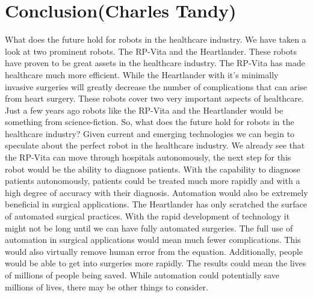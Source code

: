 \documentclass[11pt,conference]{IEEEtran}
\begin{document}
\section{Conclusion(Charles Tandy)}

\indent What does the future hold for robots in the healthcare industry. We have taken a look at two prominent robots. The RP-Vita and the Heartlander. These robots have proven to be great assets in the healthcare industry. The RP-Vita has made healthcare much more efficient. While the Heartlander with it's minimally invasive surgeries will greatly decrease the number of complications that can arise from heart surgery. These robots cover two very important aspects of healthcare. Just a few years ago robots like the RP-Vita and the Heartlander would be something from science-fiction. So, what does the future hold for robots in the healthcare industry?
\newline
\indent Given current and emerging technologies we can begin to speculate about the perfect robot in the healthcare industry. We already see that the RP-Vita can move through hospitals autonomously, the next step for this robot would be the ability to diagnose patients. With the capability to diagnose patients autonomously, patients could be treated much more rapidly and with a high degree of accuracy with their diagnosis. Automation would also be extremely beneficial in surgical applications. The Heartlander has only scratched the surface of automated surgical practices. With the rapid development of technology it might not be long until we can have fully automated surgeries. The full use of automation in surgical applications would mean much fewer complications. This would also virtually remove human error from the equation. Additionally, people would be able to get into surgeries more rapidly. The results could mean the lives of millions of people being saved. 
\newline
\indent While automation could potentially save millions of lives, there may be other things to consider.
\end{document}
